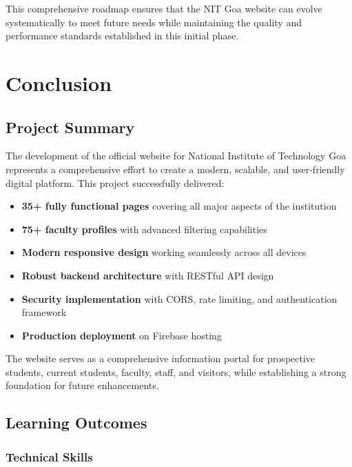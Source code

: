 \documentclass[12pt,a4paper]{report}
\begin{document}
This comprehensive roadmap ensures that the NIT Goa website can evolve systematically to meet future needs while maintaining the quality and performance standards established in this initial phase.


\chapter{Conclusion}

\section{Project Summary}

The development of the official website for National Institute of Technology Goa represents a comprehensive effort to create a modern, scalable, and user-friendly digital platform. This project successfully delivered:

\begin{itemize}
    \item \textbf{35+ fully functional pages} covering all major aspects of the institution
    \item \textbf{75+ faculty profiles} with advanced filtering capabilities
    \item \textbf{Modern responsive design} working seamlessly across all devices
    \item \textbf{Robust backend architecture} with RESTful API design
    \item \textbf{Security implementation} with CORS, rate limiting, and authentication framework
    \item \textbf{Production deployment} on Firebase hosting
\end{itemize}

The website serves as a comprehensive information portal for prospective students, current students, faculty, staff, and visitors, while establishing a strong foundation for future enhancements.

\section{Learning Outcomes}

\subsection*{Technical Skills}
\end{document}
